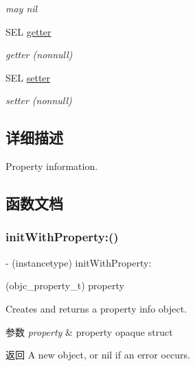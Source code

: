 \begin{DoxyCompactItemize}
\begin{DoxyCompactList}\small\item\em may nil \end{DoxyCompactList}\item 
S\+EL \hyperlink{interface_m_a_r_class_property_info_a51e491e6475d0516acb38541a3c90c7d}{getter}
\begin{DoxyCompactList}\small\item\em getter (nonnull) \end{DoxyCompactList}\item 
S\+EL \hyperlink{interface_m_a_r_class_property_info_a983d6c85e309ba731597a89a4452602c}{setter}
\begin{DoxyCompactList}\small\item\em setter (nonnull) \end{DoxyCompactList}\end{DoxyCompactItemize}


\subsection{详细描述}
Property information. 

\subsection{函数文档}
\mbox{\label{interface_m_a_r_class_property_info_afa1f3862f32fdfe20c54eab41ad7f63b}} 
\subsubsection{\texorpdfstring{init\+With\+Property\+:()}{initWithProperty:()}}
{\footnotesize\ttfamily -\/ (instancetype) init\+With\+Property\+: \begin{DoxyParamCaption}\item[{(objc\+\_\+property\+\_\+t)}]{property }\end{DoxyParamCaption}}

Creates and returns a property info object.


\begin{DoxyParams}{参数}
{\em property} & property opaque struct \\
\hline
\end{DoxyParams}
\begin{DoxyReturn}{返回}
A new object, or nil if an error occurs. 
\end{DoxyReturn}


